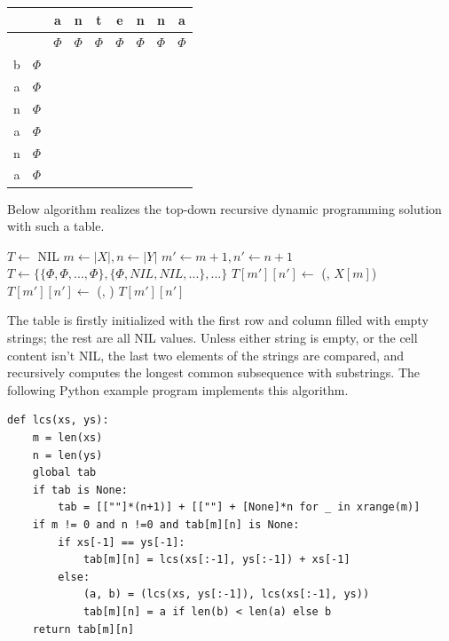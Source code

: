 \documentclass[UTF8]{article}
\begin{document}
\begin{tabular}{|c|c|c|c|c|c|c|c|c|}
\hline
 & & a & n & t & e & n & n & a \\
\hline
 & & $\Phi$ & $\Phi$ & $\Phi$ & $\Phi$ & $\Phi$ & $\Phi$ & $\Phi$ \\
\hline
b & $\Phi$ & & & & & & & \\
\hline
a & $\Phi$ & & & & & & & \\
\hline
n & $\Phi$ & & & & & & & \\
\hline
a & $\Phi$ & & & & & & & \\
\hline
n & $\Phi$ & & & & & & & \\
\hline
a & $\Phi$ & & & & & & & \\
\hline
\end{tabular}

Below algorithm realizes the top-down recursive dynamic programming
solution with such a table.

\begin{algorithmic}[1]
\State $T \gets$ NIL
  \State $m \gets |X|, n \gets |Y|$
  \State $m' \gets m+1, n' \gets n+1$
    \State $T \gets \{\{\Phi, \Phi, ..., \Phi\}, \{\Phi, NIL, NIL, ...\}, ...\}$ 
  \EndIf
      \State $T[m'][n'] \gets$ (, $X[m]$)
    \Else
      \State $T[m'][n'] \gets$ (, )
    \EndIf
  \EndIf
  \State \Return $T[m'][n']$
\EndFunction
\end{algorithmic}

The table is firstly initialized with the first row and column filled with empty strings; the rest
are all NIL values. Unless either string is empty, or the cell content isn't NIL, the last two
elements of the strings are compared, and recursively computes the longest common subsequence
with substrings. The following Python example program implements this algorithm.

\lstset{language=Python}
\begin{lstlisting}
def lcs(xs, ys):
    m = len(xs)
    n = len(ys)
    global tab
    if tab is None:
        tab = [[""]*(n+1)] + [[""] + [None]*n for _ in xrange(m)]
    if m != 0 and n !=0 and tab[m][n] is None:
        if xs[-1] == ys[-1]:
            tab[m][n] = lcs(xs[:-1], ys[:-1]) + xs[-1]
        else:
            (a, b) = (lcs(xs, ys[:-1]), lcs(xs[:-1], ys))
            tab[m][n] = a if len(b) < len(a) else b
    return tab[m][n]
\end{lstlisting}
\end{document}
